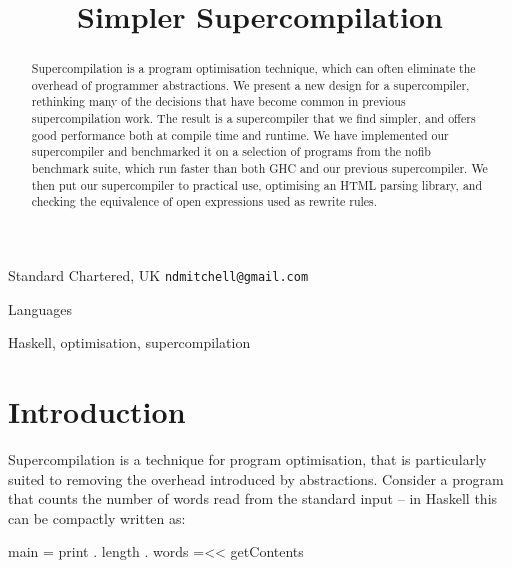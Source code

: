 \documentclass[draft]{sigplanconf}
\begin{document}

\titlebanner{\today{} - \currenttime{}}        %
\preprintfooter{}   %

\title{Simpler Supercompilation}

           {Standard Chartered, UK}
           {\verb"ndmitchell@gmail.com"}

\maketitle

\begin{abstract}
Supercompilation is a program optimisation technique, which can often eliminate the overhead of programmer abstractions. We present a new design for a supercompiler, rethinking many of the decisions that have become common in previous supercompilation work. The result is a supercompiler that we find simpler, and offers good performance both at compile time and runtime. We have implemented our supercompiler and benchmarked it on a selection of programs from the nofib benchmark suite, which run faster than both GHC and our previous supercompiler. We then put our supercompiler to practical use, optimising an HTML parsing library, and checking the equivalence of open expressions used as rewrite rules.
\end{abstract}


\terms
Languages

\keywords
Haskell, optimisation, supercompilation

\section{Introduction}


Supercompilation is a technique for program optimisation, that is particularly suited to removing the overhead introduced by abstractions. Consider a program that counts the number of words read from the standard input -- in Haskell \cite{haskell} this can be compactly written as:

\begin{code}
main = print . length . words =<< getContents
\end{code}
\end{document}
